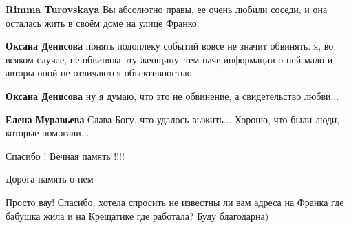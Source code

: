 \begin{itemize}
\begin{itemize}
\begin{itemize}
\textbf{Rimma Turovskaya} Вы абсолютно правы, ее очень любили соседи, и она осталась жить в своём доме на улице Франко.

\textbf{Оксана Денисова} понять подоплеку событий вовсе не значит обвинять. я, во всяком случае, не обвиняла эту женщину. тем паче,информации о ней мало и авторы оной не отличаются объективностью

\textbf{Оксана Денисова} ну я думаю, что это не обвинение, а свидетельство любви...
\end{itemize} %

\textbf{Елена Муравьева} Слава Богу, что удалось выжить... Хорошо, что были люди, которые помогали...

Спасибо !
Вечная память !!!!

\end{itemize} %

Дорога память о нем


Просто вау! Спасибо, хотела спросить не известны ли вам адреса на Франка где
бабушка жила и на Крещатике где работала? Буду благодарна)

\end{itemize} %

